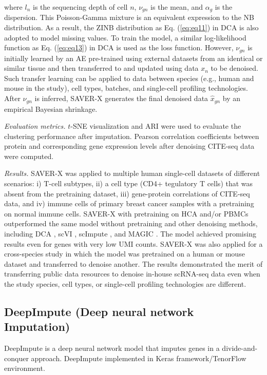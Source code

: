 \documentclass[
]{book}
\begin{document}
where \(l_{n}\) is the sequencing depth of cell \(n\), \(ν_{gn}\) is the mean, and \(\alpha_{g}\) is the dispersion. This Poisson-Gamma mixture is an equivalent expression to the NB distribution. As a result, the ZINB distribution as Eq. (\eqref{eq:eq11}) in DCA is also adopted to model missing values.
To train the model, a similar log-likelihood function as Eq. (\eqref{eq:eq13}) in DCA is used as the loss function. However, \(ν_{gn}\) is initially learned by an AE pre-trained using external datasets from an identical or similar tissue and then transferred to and updated using data \(x_{n}\) to be denoised. Such transfer learning can be applied to data between species (e.g., human and mouse in the study), cell types, batches, and single-cell profiling technologies. After \(ν_{gn}\) is inferred, SAVER-X generates the final denoised data \(\hat{x}_{gn}\) by an empirical Bayesian shrinkage.

\emph{Evaluation metrics.} \(t\)-SNE visualization and ARI were used to evaluate the clustering performance after imputation. Pearson correlation coefficients between protein and corresponding gene expression levels after denoising CITE-seq data were computed.

\emph{Results.} SAVER-X was applied to multiple human single-cell datasets of different scenarios: i) T-cell subtypes, ii) a cell type (CD4+ tegulatory T cells) that was absent from the pretraining dataset, iii) gene-protein correlations of CITE-seq data, and iv) immune cells of primary breast cancer samples with a pretraining on normal immune cells. SAVER-X with pretraining on HCA and/or PBMCs outperformed the same model without pretraining and other denoising methods, including DCA \citep{RN80}, scVI \citep{RN88}, scImpute \citep{RN31}, and MAGIC \citep{RN111}. The model achieved promising results even for genes with very low UMI counts. SAVER-X was also applied for a cross-species study in which the model was pretrained on a human or mouse dataset and transferred to denoise another. The results demonstrated the merit of transferring public data resources to denoise in-house scRNA-seq data even when the study species, cell types, or single-cell profiling technologies are different.

\hypertarget{ch-5-1-3}{%
\subsection{DeepImpute (Deep neural network Imputation)}\label{ch-5-1-3}}

DeepImpute \citep{RN46} is a deep neural network model that imputes genes in a divide-and-conquer approach. DeepImpute implemented in Keras framework/TenorFlow environment.
\end{document}
